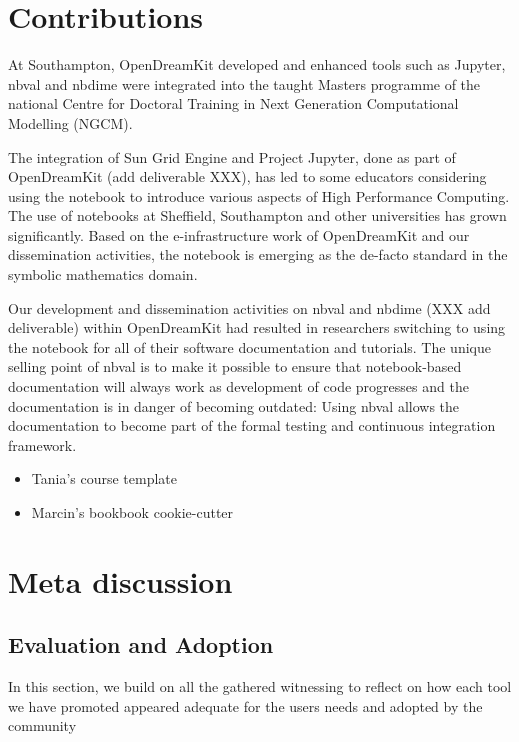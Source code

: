 \documentclass{deliverablereport}
\begin{document}
\section{Contributions}

At Southampton, OpenDreamKit developed and enhanced tools such as
Jupyter, nbval and nbdime were integrated into the taught Masters
programme of the national Centre for Doctoral Training in Next
Generation Computational Modelling (NGCM).

The integration of Sun Grid Engine and Project Jupyter, done as part of
OpenDreamKit (add deliverable XXX), has led to some educators
considering using the notebook to introduce various aspects of High
Performance Computing. The use of notebooks at Sheffield, Southampton
and other universities has grown significantly. Based on the
e-infrastructure work of OpenDreamKit and our dissemination activities,
the notebook is emerging as the de-facto standard in the symbolic
mathematics domain.

Our development and dissemination activities on nbval and nbdime (XXX
add deliverable) within OpenDreamKit had resulted in researchers
switching to using the notebook for all of their software documentation
and tutorials. The unique selling point of nbval is to make it possible
to ensure that notebook-based documentation will always work as
development of code progresses and the documentation is in danger of
becoming outdated: Using nbval allows the documentation to become part
of the formal testing and continuous integration framework.

\begin{itemize}
\tightlist
\item
  Tania's course template
\item
  Marcin's bookbook cookie-cutter
\end{itemize}

\section{Meta discussion}

\subsection{Evaluation and Adoption}

In this section, we build on all the gathered witnessing to reflect on
how each tool we have promoted appeared adequate for the users needs and
adopted by the community
\end{document}
